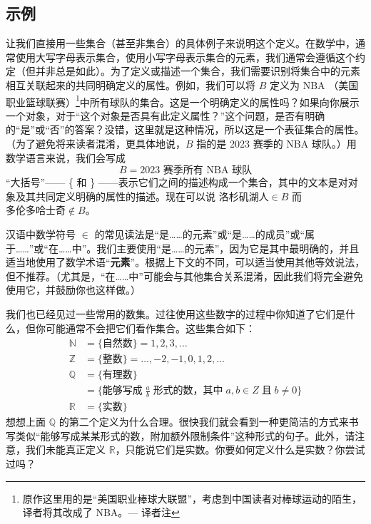 \subsection{示例}

让我们直接用一些集合（甚至非集合）的具体例子来说明这个定义。在数学中，通常使用大写字母表示集合，使用小写字母表示集合的元素，我们通常会遵循这个约定（但并非总是如此）。为了定义或描述一个集合，我们需要识别将集合中的元素相互关联起来的共同明确定义的属性。例如，我们可以将 $B$ 定义为 NBA （美国职业篮球联赛）\footnote{原作这里用的是``美国职业棒球大联盟''，考虑到中国读者对棒球运动的陌生，译者将其改成了 NBA。--- 译者注}中所有球队的集合。这是一个明确定义的属性吗？如果向你展示一个对象，对于``这个对象是否具有此定义属性？''这个问题，是否有明确的``是''或``否''的答案？没错，这里就是这种情况，所以这是一个表征集合的属性。（为了避免将来读者混淆，更具体地说，$B$ 指的是 2023 赛季的 NBA 球队。）用数学语言来说，我们会写成
\[B = {\text{2023 赛季所有 NBA 球队}}\]
``大括号''—— \{ 和 \} ——表示它们之间的描述构成一个集合，其中的文本是对对象及其共同定义明确的属性的描述。现在可以说 $\text{洛杉矶湖人} \in B$ 而 $\text{多伦多哈士奇} \notin B$。

汉语中数学符号 $\in$ 的常见读法是``是……的元素''或``是……的成员''或``属于……''或``在……中''。我们主要使用``是……的元素''，因为它是其中最明确的，并且适当地使用了数学术语``\textbf{元素}''。根据上下文的不同，可以适当使用其他等效说法，但不推荐。（尤其是，``在……中''可能会与其他集合关系混淆，因此我们将完全避免使用它，并鼓励你也这样做。）

我们也已经见过一些常用的数集。过往使用这些数字的过程中你知道了它们是什么，但你可能通常不会把它们看作集合。这些集合如下：
\begin{align*}
    \mathbb{N} &= \{ \text{自然数} \} = {1, 2, 3, \dots}\\
    \mathbb{Z} &= \{ \text{整数} \} = {\dots , -2, -1, 0, 1, 2, \dots}\\
    \mathbb{Q} &= \{ \text{有理数} \}\\
      &= \{ \text{能够写成}\; \frac{a}{b} \;\text{形式的数，其中}\; a, b \in Z \;\text{且}\; b \ne 0 \}\\
      \mathbb{R} &= \{ \text{实数}\}
\end{align*}
想想上面 $\mathbb{Q}$ 的第二个定义为什么合理。很快我们就会看到一种更简洁的方式来书写类似``能够写成某某形式的数，附加额外限制条件''这种形式的句子。此外，请注意，我们未能真正定义 $\mathbb{R}$，只能说它们是实数。你要如何定义什么是实数？你尝试过吗？
